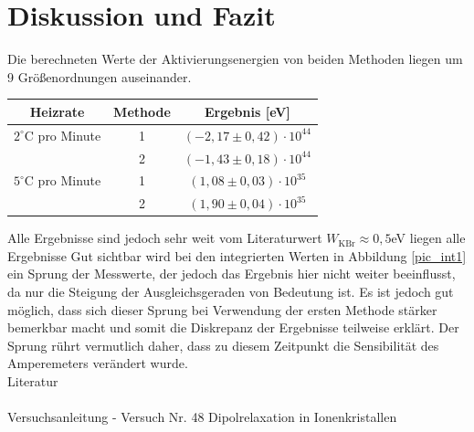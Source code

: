 \section{Diskussion und Fazit}
Die berechneten Werte der Aktivierungsenergien von beiden Methoden  liegen um 9 Größenordnungen auseinander. 

\begin{table}[H]
\begin{tabular}{c|c|c}
Heizrate & Methode & Ergebnis [eV]\\\hline
$2^\circ$C pro Minute & 1 &	$(-2,17\pm 0,42)\cdot10^{44}$	\\
 & 2 &		$(-1,43 \pm 0,18)\cdot10^{44}$\\\hline
 $5^\circ$C pro Minute & 1 &	$(1,08    \pm 0,03)\cdot 10^{35}$	\\
 & 2 &	$(1,90	\pm 0,04)\cdot 10^{35}$	\\
\end{tabular}
\end{table}
Alle Ergebnisse sind jedoch sehr weit vom Literaturwert $W_\text{KBr}\approx0,5$eV liegen alle Ergebnisse
Gut sichtbar wird bei den integrierten Werten in Abbildung \ref{pic_int1} ein Sprung der Messwerte, der jedoch das Ergebnis hier nicht weiter beeinflusst, da nur die Steigung der Ausgleichsgeraden von Bedeutung ist. Es ist jedoch gut möglich, dass sich dieser Sprung bei Verwendung der ersten Methode stärker bemerkbar macht und somit die Diskrepanz der Ergebnisse teilweise erklärt. Der Sprung rührt vermutlich daher, dass zu diesem Zeitpunkt die Sensibilität des Amperemeters verändert wurde.\\


\parskip 340pt
\Large{Literatur}\\\\
Versuchsanleitung - Versuch Nr. 48 Dipolrelaxation in Ionenkristallen





